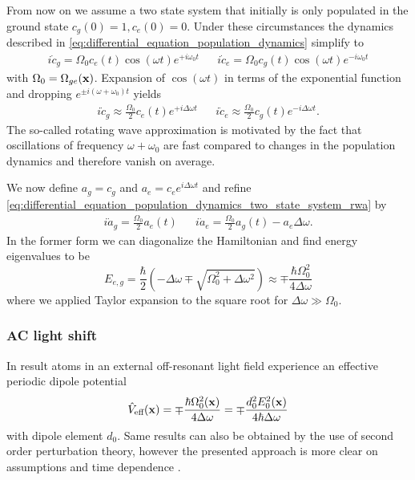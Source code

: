 From now on we assume a two state system that initially is only populated in
the ground state $c_g(0)=1,c_e(0)=0$. Under these circumstances the dynamics
described in \cref{eq:differential_equation_population_dynamics} simplify to
\begin{align}
  i\dot{c}_g=\Omega_0c_e(t)\cos(\omega t)e^{+i\omega_0 t} &&
  i\dot{c}_e=\Omega_0c_g(t)\cos(\omega t)e^{-i\omega_0 t}
  \label{eq:differential_equation_population_dynamics_two_state_system}
\end{align}
with $\Omega_0=\Omega_{ge}(\vb{x})$. Expansion of $\cos(\omega t)$ in terms
of the exponential function and dropping $e^{\pm i(\omega+\omega_0)t}$ yields
\begin{align}
  i\dot{c}_g\approx\frac{\Omega_0}{2}c_e(t)e^{+i\Delta\omega t} &&
  i\dot{c}_e\approx\frac{\Omega_0}{2}c_g(t)e^{-i\Delta\omega t}
  \label{eq:differential_equation_population_dynamics_two_state_system_rwa}.
\end{align}
The so-called rotating wave approximation is motivated by the fact that
oscillations of frequency $\omega+\omega_0$ are fast compared to changes in
the population dynamics and therefore vanish on average.

We now define $a_g=c_g$ and $a_e=c_ee^{i\Delta\omega t}$ and refine
\cref{eq:differential_equation_population_dynamics_two_state_system_rwa} by
\begin{align}
  i\dot{a}_g=\frac{\Omega_0}{2}a_e(t) &&
  i\dot{a}_e=\frac{\Omega_0}{2}a_g(t)-a_e\Delta\omega
  \label{eq:differential_equation_population_dynamics_two_state_system_shift}.
\end{align}
In the former form we can diagonalize the Hamiltonian and find energy
eigenvalues to be
\begin{equation}
  E_{e,g}
  =\frac{\hbar}{2}\left(-\Delta\omega\mp\sqrt{\Omega_0^2+\Delta\omega^2}\right)
  \approx
  \mp\frac{\hbar\Omega_0^2}{4\Delta\omega}
  \label{eq:eigenvalues_energy_light_shift}
\end{equation}
where we applied Taylor expansion to the square root for
$\Delta\omega\gg\Omega_0$.

\subsubsection{AC light shift}

In result atoms in an external off-resonant light field experience an
effective periodic dipole potential
\begin{equation}
  \hat{V}_\text{eff}(\vb{x})
  =
  \mp\frac{\hbar\Omega_0^2(\vb{x})}{4\Delta\omega}
  =
  \mp\frac{d_0^2E_0^2(\vb{x})}{4\hbar\Delta\omega}
  \label{eq:potential_effective}
\end{equation}
with dipole element $d_0$. Same results can also be obtained by the use of
second order perturbation theory, however the presented approach is more
clear on assumptions and time dependence \cite{Grimm2008}.

